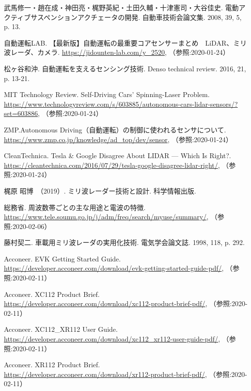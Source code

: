 {\small
\begin{thebibliography}{9}
   武馬修一・趙在成・神田亮・梶野英紀・土田久輔・十津憲司・大谷佳史. 電動アクティブサスペンションアクチェータの開発. 自動車技術会論文集. 2008, 39, 5, p. 13.

   自動運転LAB. 【最新版】自動運転の最重要コアセンサーまとめ　LiDAR、ミリ波レーダ、カメラ. \url{https://jidounten-lab.com/y_2520}, （参照:2020-01-24）

   松ヶ谷和沖. 自動運転を支えるセンシング技術. Denso technical review. 2016, 21, p. 13-21.

   MIT Technology Review. Self-Driving Cars’ Spinning-Laser Problem. \url{https://www.technologyreview.com/s/603885/autonomous-cars-lidar-sensors/?set=603886}, （参照:2020-01-24）

   ZMP.Autonomous Driving（自動運転）の制御に使われるセンサについて. \url{https://www.zmp.co.jp/knowledge/ad_top/dev/sensor}, （参照:2020-01-24）

   CleanTechnica. Tesla \& Google Disagree About LIDAR — Which Is Right?. \url{https://cleantechnica.com/2016/07/29/tesla-google-disagree-lidar-right/}, （参照:2020-01-24）

  梶原 昭博　（2019）. ミリ波レーダー技術と設計. 科学情報出版.

   総務省. 周波数帯ごとの主な用途と電波の特徴. \url{https://www.tele.soumu.go.jp/j/adm/freq/search/myuse/summary/}, （参照:2020-02-06）

   藤村契二. 車載用ミリ波レーダの実用化技術. 電気学会論文誌. 1998, 118, p. 292.

   Acconeer. EVK Getting Started Guide. \url{https://developer.acconeer.com/download/evk-getting-started-guide-pdf/}, （参照:2020-02-11）

   Acconeer. XC112 Product Brief. \url{https://developer.acconeer.com/download/xc112-product-brief-pdf/}, （参照:2020-02-11）

   Acconeer. XC112\_XR112 User Guide. \url{https://developer.acconeer.com/download/xc112_xr112-user-guide-pdf/}, （参照:2020-02-11）

   Acconeer. XR112 Product Brief. \url{https://developer.acconeer.com/download/xr112-product-brief-pdf/}, （参照:2020-02-11）


\end{thebibliography}}
